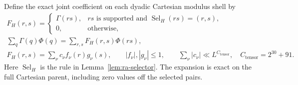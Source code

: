 Define the exact joint coefficient on each dyadic Cartesian modulus shell by
\begin{equation}\label{eq:ra-global-tensor}
\begin{gathered}
 F_H(r,s)=
 \begin{cases}
 \Gamma(rs),&rs\text{ is supported and }\operatorname{Sel}_H(rs)=(r,s),\\
 0,&\text{otherwise},
 \end{cases}\\
 \sum_q\Gamma(q)\Phi(q)=\sum_{r,s}F_H(r,s)\Phi(rs),\\
 F_H(r,s)=\sum_\nu c_\nu f_\nu(r)g_\nu(s),\qquad
 |f_\nu|,|g_\nu|\le1,\qquad
 \sum_\nu|c_\nu|\ll L^{C_{\mathrm{tensor}}},\quad C_{\mathrm{tensor}}=2^{30}+91.
\end{gathered}
\end{equation}
Here \(\operatorname{Sel}_H\) is the rule in Lemma~\ref{lem:ra-selector}.
The expansion is exact on the full Cartesian parent, including zero values
off the selected pairs.

